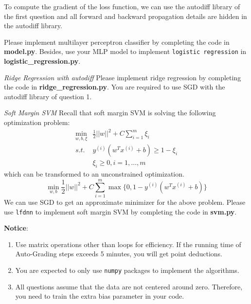\documentclass[a4paper, 12pt]{exam}
\begin{document}
\begin{questions}
		To compute the gradient of the loss function, we can use the autodiff library of the first question and all forward and backward propagation details
		are hidden in the autodiff library.

		Please implement multilayer perceptron classifier by completing the code in \textbf{model.py}.
		Besides, use your MLP model to implement \texttt{logistic regression} in \linebreak[4] \textbf{logistic\_regression.py}.
		
		\question \emph{Ridge Regression with autodiff}
		Please implement ridge regression by completing the code in \textbf{ridge\_regression.py}.
		You are required to use SGD with the autodiff library of question 1.

		\question \emph{Soft Margin SVM}
		Recall that soft margin SVM is solving
		the following optimization problem:
		\begin{align*}
		    \min_{w,b,\xi}& \frac{1}{2}||w||^2 + C \sum_{i=1}^m \xi_i \\
		    s.t.\, &y^{(i)} (w^T x^{(i)} + b) \geq 1 -\xi_i \\
		    &\xi_i \geq 0, i=1,\dots, m
		\end{align*}
		which can be transformed to an unconstrained
		optimization.
		\begin{equation*}
		    \min_{w, b} \frac{1}{2}||w||^2  + C\sum_{i=1}^m \max\{0, 1 - y^{(i)} (w^T x^{(i)} + b) \}
		\end{equation*}
		We can use SGD to get an approximate minimizer for the above problem.
		Please use \texttt{lfdnn} to implement soft margin SVM by completing the code in \textbf{svm.py}.		
	\end{questions}
	
	
	\nocite{*}
	\begin{flushleft}
		\textbf{Notice}: \\
		\begin{enumerate}[label=\roman*]
			\item Use matrix operations other than loops for efficiency. If the running time of Auto-Grading steps exceeds 5 minutes, you will get point deductions.
			\item You are expected to only use \texttt{numpy} packages to implement the algorithms.
			\item All questions assume that the data are not centered around zero. Therefore, you need to train the extra bias parameter in your code.
		\end{enumerate}
	\end{flushleft}
	
\end{document}
